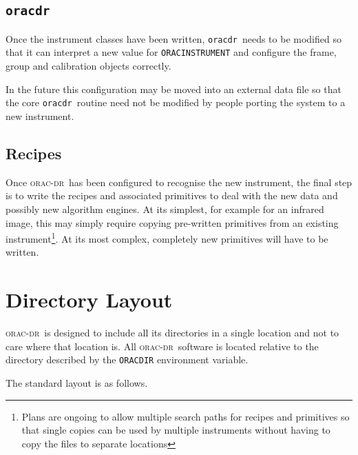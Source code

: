 \documentclass[twoside,11pt]{article}
\renewcommand{\_}{\texttt{\symbol{95}}}
\newcommand{\Oracdr}{\textsc{orac-dr}}
\newcommand{\oracdr}{\texttt{oracdr}}
\begin{document}
\subsection{\oracdr}

Once the instrument classes have been written, \oracdr\ needs to be
modified so that it can interpret a new value for
\texttt{ORAC\_INSTRUMENT} and configure the frame, group and
calibration objects correctly.

In the future this configuration may be moved into an external data
file so that the core \oracdr\ routine need not be modified by people
porting the system to a new instrument.

\subsection{Recipes}

Once \Oracdr\ has been configured to recognise the new instrument, the 
final step is to write the recipes and associated primitives to deal
with the new data and possibly new algorithm engines. At its simplest, 
for example for an infrared image, this may simply require copying
pre-written primitives from an existing instrument\footnote{Plans are
ongoing to allow multiple search paths for recipes and primitives so
that single copies can be used by multiple instruments without having
to copy the files to separate locations}.
At its most complex, completely new primitives will have to be written.

\appendix

\section{Directory Layout}

\Oracdr\ is designed to include all its directories in a single
location and not to care where that location is. All \Oracdr\ software
is located relative to the directory described by  the \texttt{ORAC\_DIR}
environment variable.

The standard layout is as follows.
\end{document}
